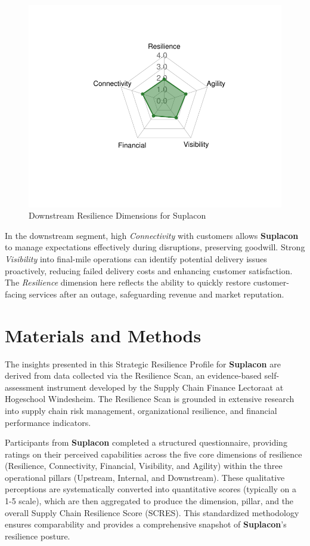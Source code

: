 \documentclass[
  oneside,
  open=any,
  fontsize=11pt]{scrbook}
\begin{document}
\begin{figure}[H]

{\centering \includegraphics[width=0.8\linewidth,height=\textheight,keepaspectratio]{example_3_files/figure-pdf/downstream-radar-chart-1.pdf}

}

\caption{Downstream Resilience Dimensions for Suplacon}

\end{figure}%

In the downstream segment, high \emph{Connectivity} with customers
allows \textbf{Suplacon} to manage expectations effectively during
disruptions, preserving goodwill. Strong \emph{Visibility} into
final-mile operations can identify potential delivery issues
proactively, reducing failed delivery costs and enhancing customer
satisfaction. The \emph{Resilience} dimension here reflects the ability
to quickly restore customer-facing services after an outage,
safeguarding revenue and market reputation.

\chapter{Materials and Methods}\label{materials-and-methods}

The insights presented in this Strategic Resilience Profile for
\textbf{Suplacon} are derived from data collected via the Resilience
Scan, an evidence-based self-assessment instrument developed by the
Supply Chain Finance Lectoraat at Hogeschool Windesheim. The Resilience
Scan is grounded in extensive research into supply chain risk
management, organizational resilience, and financial performance
indicators.

Participants from \textbf{Suplacon} completed a structured
questionnaire, providing ratings on their perceived capabilities across
the five core dimensions of resilience (Resilience, Connectivity,
Financial, Visibility, and Agility) within the three operational pillars
(Upstream, Internal, and Downstream). These qualitative perceptions are
systematically converted into quantitative scores (typically on a 1-5
scale), which are then aggregated to produce the dimension, pillar, and
the overall Supply Chain Resilience Score (SCRES). This standardized
methodology ensures comparability and provides a comprehensive snapshot
of \textbf{Suplacon}'s resilience posture.
\end{document}
